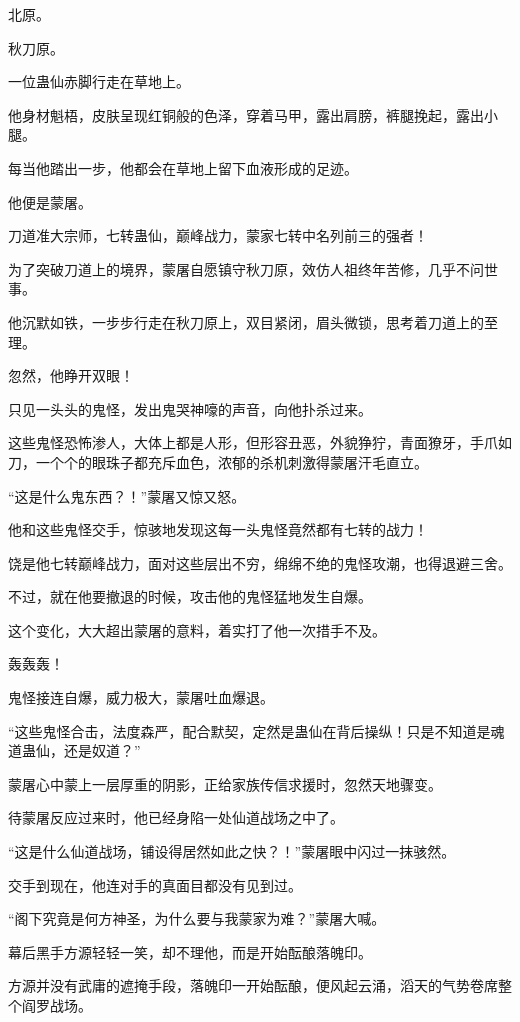 
\begin{this_body}

北原。

秋刀原。

一位蛊仙赤脚行走在草地上。

他身材魁梧，皮肤呈现红铜般的色泽，穿着马甲，露出肩膀，裤腿挽起，露出小腿。

每当他踏出一步，他都会在草地上留下血液形成的足迹。

他便是蒙屠。

刀道准大宗师，七转蛊仙，巅峰战力，蒙家七转中名列前三的强者！

为了突破刀道上的境界，蒙屠自愿镇守秋刀原，效仿人祖终年苦修，几乎不问世事。

他沉默如铁，一步步行走在秋刀原上，双目紧闭，眉头微锁，思考着刀道上的至理。

忽然，他睁开双眼！

只见一头头的鬼怪，发出鬼哭神嚎的声音，向他扑杀过来。

这些鬼怪恐怖渗人，大体上都是人形，但形容丑恶，外貌狰狞，青面獠牙，手爪如刀，一个个的眼珠子都充斥血色，浓郁的杀机刺激得蒙屠汗毛直立。

“这是什么鬼东西？！”蒙屠又惊又怒。

他和这些鬼怪交手，惊骇地发现这每一头鬼怪竟然都有七转的战力！

饶是他七转巅峰战力，面对这些层出不穷，绵绵不绝的鬼怪攻潮，也得退避三舍。

不过，就在他要撤退的时候，攻击他的鬼怪猛地发生自爆。

这个变化，大大超出蒙屠的意料，着实打了他一次措手不及。

轰轰轰！

鬼怪接连自爆，威力极大，蒙屠吐血爆退。

“这些鬼怪合击，法度森严，配合默契，定然是蛊仙在背后操纵！只是不知道是魂道蛊仙，还是奴道？”

蒙屠心中蒙上一层厚重的阴影，正给家族传信求援时，忽然天地骤变。

待蒙屠反应过来时，他已经身陷一处仙道战场之中了。

“这是什么仙道战场，铺设得居然如此之快？！”蒙屠眼中闪过一抹骇然。

交手到现在，他连对手的真面目都没有见到过。

“阁下究竟是何方神圣，为什么要与我蒙家为难？”蒙屠大喊。

幕后黑手方源轻轻一笑，却不理他，而是开始酝酿落魄印。

方源并没有武庸的遮掩手段，落魄印一开始酝酿，便风起云涌，滔天的气势卷席整个阎罗战场。


\end{this_body}
